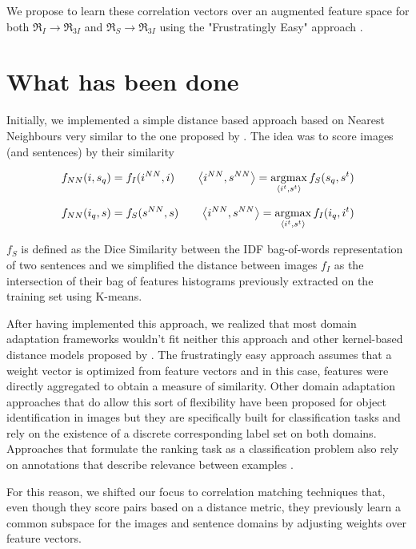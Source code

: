 \documentclass[11pt]{article}
\begin{document}
We propose to learn these correlation vectors over an augmented feature space for both $\Re_{I} \rightarrow \Re_{3I}$ and $\Re_{S} \rightarrow \Re_{3I}$ using the "Frustratingly Easy" approach \cite{daumeiii:2007:ACLMain}.

\section{What has been done}

Initially, we implemented a simple distance based approach based on Nearest Neighbours very similar to the one proposed by \cite{Hodosh:2013:FID:2566972.2566993}. The idea was to score images (and sentences) by their similarity

$$f_{NN}(i,s_q) = f_{I}(i^{NN},i) \;\;\;\;\;\;\; \left \langle i^{NN},s^{NN}  \right \rangle = \operatornamewithlimits{argmax}_{\left \langle i^{t}, s^{t}\right \rangle} f_{S}(s_{q}, s^{t})$$

$$f_{NN}(i_q,s) = f_{S}(s^{NN},s) \;\;\;\;\;\;\; \left \langle i^{NN},s^{NN}  \right \rangle = \operatornamewithlimits{argmax}_{\left \langle i^{t}, s^{t}\right \rangle} f_{I}(i_{q}, i^{t})$$

$f_S$ is defined as the Dice Similarity between the IDF bag-of-words representation of two sentences \cite{Hodosh:2013:FID:2566972.2566993} and we simplified the distance between images $f_I$ as the intersection of their bag of features histograms previously extracted on the training set using K-means.

After having implemented this approach, we realized that most domain adaptation frameworks wouldn't fit neither this approach and other kernel-based distance models proposed by \cite{Hodosh:2013:FID:2566972.2566993}. The frustratingly easy approach assumes that a weight vector is optimized from feature vectors and in this case, features were directly aggregated to obtain a measure of similarity. Other domain adaptation approaches that do allow this sort of flexibility have been proposed for object identification in images \cite{Saenko:2010:AVC:1888089.1888106} \cite{Kulis:2011:YSY:2191740.2191798} but they are specifically built for classification tasks and rely on the existence of a discrete corresponding label set on both domains. Approaches that formulate the ranking task as a classification problem also rely on annotations that describe relevance between examples \cite{NIPS2007_3270}. 

For this reason, we shifted our focus to correlation matching techniques that, even though they score pairs based on a distance metric, they previously learn a common subspace for the images and sentence domains by adjusting weights over feature vectors. 
\end{document}
